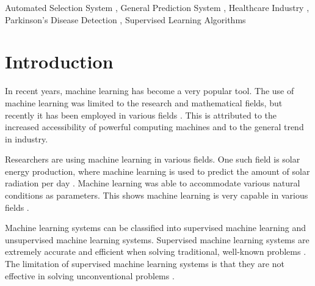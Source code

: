 \documentclass[a4paper,fleqn]{cas-dc}
\begin{document}


\begin{keywords}
    Automated Selection System \sep
    General Prediction System \sep
    Healthcare Industry \sep
    Parkinson's Disease Detection \sep
    Supervised Learning Algorithms
\end{keywords}


\maketitle



\section{Introduction}\label{sec:introduciton}

In recent years, machine learning has become a very popular tool. The use of machine learning was limited to the research and mathematical fields, but recently it has been employed in various fields \cite{ref_paper_36}. This is attributed to the increased accessibility of powerful computing machines and to the general trend in industry.

Researchers are using machine learning in various fields. One such field is solar energy production, where machine learning is used to predict the amount of solar radiation per day \cite{ref_paper_7}. Machine learning was able to accommodate various natural conditions as parameters. This shows machine learning is very capable in various fields \cite{ref_paper_10,ref_paper_29}.

Machine learning systems can be classified into supervised machine learning and unsupervised machine learning systems. Supervised machine learning systems are extremely accurate and efficient when solving traditional, well-known problems \cite{ref_paper_21}. The limitation of supervised machine learning systems is that they are not effective in solving unconventional problems \cite{ref_paper_10}.
\end{document}
